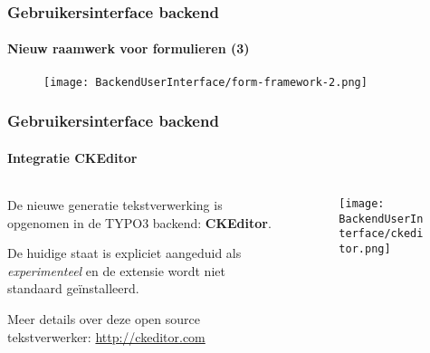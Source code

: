 \begin{frame}[fragile]
	\frametitle{Gebruikersinterface backend}
	\framesubtitle{Nieuw raamwerk voor formulieren (3)}

	\begin{figure}
		\texttt{[image: BackendUserInterface/form-framework-2.png]}
	\end{figure}

\end{frame}


\begin{frame}[fragile]
	\frametitle{Gebruikersinterface backend}
	\framesubtitle{Integratie CKEditor}

	\begin{columns}[T]
		\begin{column}{.5\textwidth}
			De nieuwe generatie tekstverwerking is opgenomen in de TYPO3 backend:
			\textbf{CKEditor}.\newline

			De huidige staat is expliciet aangeduid als \textit{experimenteel} en de extensie
			wordt niet standaard geïnstalleerd.\newline

			Meer details over deze open source tekstverwerker: \url{http://ckeditor.com}
		\end{column}
		\begin{column}{.5\textwidth}
			\begin{figure}\vspace*{-0.4cm}
				\texttt{[image: BackendUserInterface/ckeditor.png]}
			\end{figure}
		\end{column}
	\end{columns}

\end{frame}




